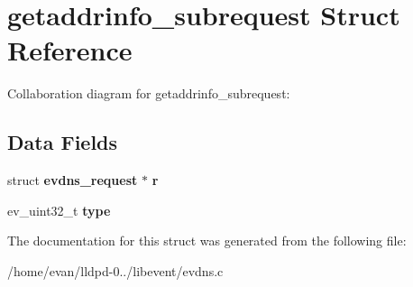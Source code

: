 \section{getaddrinfo\-\_\-subrequest \-Struct \-Reference}
\label{structgetaddrinfo__subrequest}


\-Collaboration diagram for getaddrinfo\-\_\-subrequest\-:
\subsection*{\-Data \-Fields}
\begin{DoxyCompactItemize}
\item 
struct {\bf evdns\-\_\-request} $\ast$ {\bfseries r}\label{structgetaddrinfo__subrequest_ab4a7c4f2de5db3c0a3dd0cde5e99a23d}

\item 
ev\-\_\-uint32\-\_\-t {\bfseries type}\label{structgetaddrinfo__subrequest_ac1072a70ffa6b2433a014ae53f7092e2}

\end{DoxyCompactItemize}


\-The documentation for this struct was generated from the following file\-:\begin{DoxyCompactItemize}
\item 
/home/evan/lldpd-\/0../libevent/evdns.\-c\end{DoxyCompactItemize}
